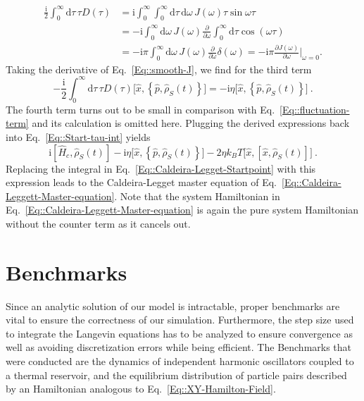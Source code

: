  	\begin{equation}
 		\begin{split}
 				\frac{\mathrm{i}}{2} \int_{0}^{\infty} \text{d} \tau\, \tau D(\tau) &=	\mathrm{i}\int_0^\infty \int_{0}^{\infty} \text{d}\tau\,	 \text{d}\omega\, J(\omega) \tau \sin \omega \tau \\
				&=- \mathrm{i}\int_0^\infty   \text{d}\omega\, J(\omega) \frac{\partial }{\partial \omega }  \int_{0}^{\infty} \text{d}\tau	\cos \left(\omega \tau \right) \\
				&=- \mathrm{i} \pi \int_0^\infty   \text{d}\omega\, J(\omega) \frac{\partial }{\partial \omega }  \delta(\omega) = - \mathrm{i} \pi \frac{\partial J(\omega)}{\partial \omega} \bigg|_{\omega =	0}.
 		\end{split} 	
 	\end{equation} 
 	Taking the derivative of Eq.~\eqref{Eq::smooth-J}, we find for the third term
 	\begin{equation}
 		-\frac{\mathrm{i}}{2} \int_{0}^{\infty} \text{d} \tau \, \tau D(\tau) \Big[\hat{x}, \left\{\hat{p}, \hat{\rho}_S(t)\right\} \Big] =	- \mathrm{i} \eta \Big[\hat{x}, \left\{\hat{p}, \hat{\rho}_S(t)\right\} \Big] ~.
 	\end{equation}
 	The fourth term turns out to be small in comparison with Eq.~\eqref{Eq::fluctuation-term} and its calculation is omitted here. Plugging the derived expressions back into Eq.~\eqref{Eq::Start-tau-int} yields
 	\begin{equation}
 		\mathrm{i} \left[\hat{H}_c, \hat{\rho}_S(t)\right] - \mathrm{i} \eta \Big[\hat{x}, \left\{\hat{p}, \hat{\rho}_S(t)\right\} \Big]- 2 \eta k_B T \Big[\hat{x}, \left[{\hat{x}} , \hat{\rho}_S(t)\right]\Big]  ~.
 	\end{equation}
 	Replacing the integral in Eq.~\eqref{Eq::Caldeira-Legget-Startpoint} with this expression leads to the Caldeira-Legget master equation of Eq.~\eqref{Eq::Caldeira-Leggett-Master-equation}. Note that the system Hamiltonian in Eq.~\eqref{Eq::Caldeira-Leggett-Master-equation} is again the pure system Hamiltonian without the counter term as it cancels out.
	\section{Benchmarks} \label{Section::Benchmarks}
	Since an analytic solution of our model is intractable, proper benchmarks are vital to ensure the correctness of our simulation. Furthermore, the step size used to integrate the Langevin equations has to be analyzed to ensure convergence as well as avoiding discretization errors while being efficient. The Benchmarks that were conducted are the dynamics of independent harmonic oscillators coupled to a thermal reservoir, and the equilibrium distribution of particle pairs described by an Hamiltonian analogous to Eq.~\eqref{Eq::XY-Hamilton-Field}. \\
	
